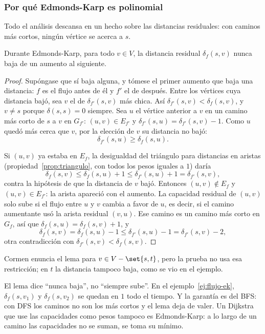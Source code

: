 \documentclass[11pt,letterpaper]{article}
\begin{document}
\subsubsection*{Por qué Edmonds-Karp es polinomial}

Todo el análisis descansa en un hecho sobre las distancias
residuales: con caminos más cortos, ningún vértice se acerca a $s$.

\begin{lema}\label{lem:flujo-distancias}
  Durante Edmonds-Karp, para todo $v \in V$, la distancia residual
  $\delta_f(s, v)$ nunca baja de un aumento al siguiente.
\end{lema}

\begin{proof}
  Supóngase que sí baja alguna, y tómese el primer aumento que baja
  una distancia: $f$ es el flujo antes de él y $f'$ el de después.
  Entre los vértices cuya distancia bajó, sea $v$ el de
  $\delta_{f'}(s, v)$ más chica. Así
  $\delta_{f'}(s, v) < \delta_f(s, v)$, y $v \ne s$ porque
  $\delta(s, s) = 0$ siempre. Sea $u$ el vértice anterior a $v$ en un
  camino más corto de $s$ a $v$ en $G_{f'}$: $(u, v) \in E_{f'}$ y
  $\delta_{f'}(s, u) = \delta_{f'}(s, v) - 1$. Como $u$ quedó más
  cerca que $v$, por la elección de $v$ su distancia no bajó:
  \[
    \delta_{f'}(s, u) \ge \delta_f(s, u) .
  \]

  Si $(u, v)$ ya estaba en $E_f$, la desigualdad del triángulo para
  distancias en aristas (propiedad~\ref{prop:triangulo}, con todos los
  pesos iguales a $1$) daría
  \[
    \delta_f(s, v) \le \delta_f(s, u) + 1 \le \delta_{f'}(s, u) + 1
    = \delta_{f'}(s, v) ,
  \]
  contra la hipótesis de que la distancia de $v$ bajó. Entonces
  $(u, v) \notin E_f$ y $(u, v) \in E_{f'}$: la arista apareció con el
  aumento. La capacidad residual de $(u, v)$ solo sube si el flujo
  entre $u$ y $v$ cambia a favor de $u$, es decir, si el camino
  aumentante usó la arista residual $(v, u)$. Ese camino es un camino
  más corto en $G_f$, así que $\delta_f(s, u) = \delta_f(s, v) + 1$,
  y
  \[
    \delta_f(s, v) = \delta_f(s, u) - 1 \le \delta_{f'}(s, u) - 1
    = \delta_{f'}(s, v) - 2 ,
  \]
  otra contradicción con $\delta_{f'}(s, v) < \delta_f(s, v)$.
\end{proof}

Cormen enuncia el lema para $v \in V - \set{s, t}$, pero la prueba no
usa esa restricción; en $t$ la distancia tampoco baja, como se vio en
el ejemplo.

\begin{ojo}
  El lema dice ``nunca baja'', no ``siempre sube''. En el
  ejemplo~\ref{ej:flujo-ek}, $\delta_f(s, v_1)$ y $\delta_f(s, v_2)$
  se quedan en $1$ todo el tiempo. Y la garantía es del BFS: con DFS
  los caminos no son los más cortos y el lema deja de valer. Un
  Dijkstra que use las capacidades como pesos tampoco es
  Edmonds-Karp: a lo largo de un camino las capacidades no se suman,
  se toma su mínimo.
\end{ojo}
\end{document}
